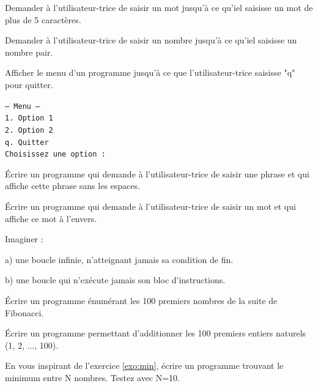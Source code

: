 \documentclass[11pt, a4paper]{book}
\begin{document}
\begin{exercice}
Demander à l'utilisateur-trice de saisir un mot jusqu'à ce qu'iel saisisse un mot de plus de 5 caractères.
\end{exercice}

\begin{exercice}
Demander à l'utilisateur-trice de saisir un nombre jusqu'à ce qu'iel saisisse un nombre pair. 
\end{exercice}

\begin{exercice}
Afficher le menu d'un programme jusqu'à ce que l'utilisateur-trice saisisse "q" pour quitter.

\texttt{--- Menu --- \\
1. Option 1\\
2. Option 2\\
q. Quitter\\
Choisissez une option :}
\end{exercice}


\begin{exercice}
Écrire un programme qui demande à l'utilisateur-trice de saisir une phrase et qui affiche cette phrase sans les espaces.
\end{exercice}


\begin{exercice}
Écrire un programme qui demande à l'utilisateur-trice de saisir un mot et qui affiche ce mot à l'envers.
\end{exercice}



\begin{exercice}
Imaginer :
\item[a)] une boucle infinie, n'atteignant jamais sa condition de fin.
\item[b)] une boucle qui n'exécute jamais son bloc d'instructions.
\end{exercice}

\begin{exercice}
Écrire un programme énumérant les 100 premiers nombres de la suite de Fibonacci.
\end{exercice}

\begin{exercice}
Écrire un programme permettant d'additionner les 100 premiers entiers naturels (1, 2, ..., 100). %
\end{exercice}

\begin{exercice}
En vous inspirant de l'exercice \ref{exo:min}, écrire un programme trouvant le minimum entre N nombres.
Testez avec N=10.
\end{exercice}
\end{document}

